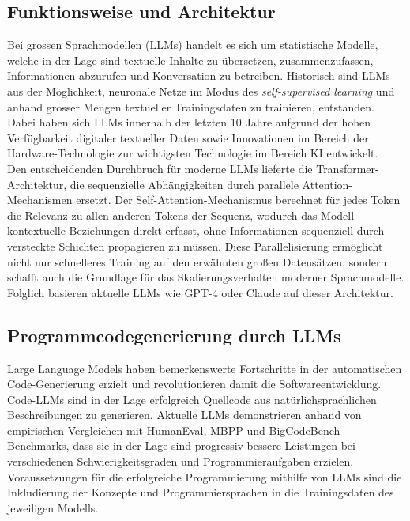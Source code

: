 \subsection{Funktionsweise und Architektur}
Bei grossen Sprachmodellen (LLMs) handelt es sich um statistische Modelle,
welche in der Lage sind textuelle Inhalte zu übersetzen, zusammenzufassen,
Informationen abzurufen und Konversation zu betreiben. Historisch sind LLMs aus
der Möglichkeit, neuronale Netze im Modus des \textit{self-supervised learning}
und anhand grosser Mengen textueller Trainingsdaten zu trainieren, entstanden.
Dabei haben sich LLMs innerhalb der letzten 10 Jahre aufgrund der hohen Verfügbarkeit digitaler
textueller Daten sowie Innovationen im Bereich der Hardware-Technologie zur
wichtigsten Technologie im Bereich KI entwickelt. \\

\noindent Den entscheidenden Durchbruch für moderne LLMs lieferte die
Transformer-Architektur, die sequenzielle Abhängigkeiten durch parallele
Attention-Mechanismen ersetzt. Der
Self-Attention-Mechanismus berechnet für jedes Token die Relevanz zu allen
anderen Tokens der Sequenz, wodurch das Modell kontextuelle Beziehungen direkt
erfasst, ohne Informationen sequenziell durch versteckte Schichten propagieren
zu müssen. Diese Parallelisierung ermöglicht nicht nur schnelleres Training auf
den erwähnten großen Datensätzen, sondern schafft auch die Grundlage für das
Skalierungsverhalten moderner Sprachmodelle. Folglich basieren aktuelle LLMs wie
GPT-4 oder Claude auf dieser Architektur.

\subsection{Programmcodegenerierung durch LLMs}%
Large Language Models haben bemerkenswerte Fortschritte in der automatischen
Code-Generierung erzielt und revolutionieren damit die Softwareentwicklung.
Code-LLMs sind in der Lage erfolgreich Quellcode aus natürlichsprachlichen
Beschreibungen zu generieren. Aktuelle LLMs demonstrieren anhand von
empirischen Vergleichen mit HumanEval, MBPP und BigCodeBench Benchmarks, dass
sie in der Lage sind progressiv bessere Leistungen bei verschiedenen
Schwierigkeitsgraden und Programmieraufgaben erzielen. 
Voraussetzungen für die erfolgreiche Programmierung mithilfe von LLMs sind die
Inkludierung der Konzepte und Programmiersprachen in die Trainingsdaten des
jeweiligen Modells.\\


